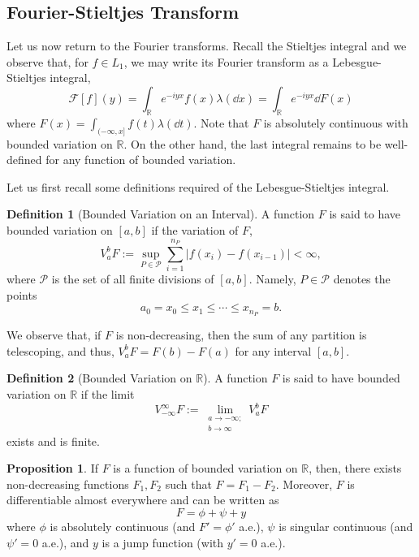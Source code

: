 \documentclass[]{article}
\theoremstyle{definition}
\theoremstyle{definition}
\newtheorem{definition}{Definition}[section]
\newtheorem{proposition}{Proposition}[section]
\begin{document}
\subsection{Fourier-Stieltjes Transform}

Let us now return to the Fourier transforms. Recall the Stieltjes integral 
and we observe that, for \(f \in L_1\), we may write its Fourier transform 
as a Lebesgue-Stieltjes integral,
\[\mathcal{F}[f](y) = \int_{\mathbb{R}}e^{-iyx}f(x)\lambda(\dd x)
  = \int_{\mathbb{R}} e^{-iyx}\dd F(x)\]
where \(F(x) = \int_{(-\infty, x]} f(t) \lambda(\dd t)\). Note that \(F\) is 
absolutely continuous with bounded variation on \(\mathbb{R}\). On the other 
hand, the last integral remains to be well-defined for any function of bounded 
variation.

Let us first recall some definitions required of the Lebesgue-Stieltjes integral. 

\begin{definition}[Bounded Variation on an Interval]
  A function \(F\) is said to have bounded variation on \([a, b]\) if the variation 
  of \(F\),
  \[V_a^bF := \sup_{P \in \mathcal{P}}\sum_{i = 1}^{n_P} |f(x_i) - f(x_{i - 1})| < \infty,\]
  where \(\mathcal{P}\) is the set of all finite divisions of \([a, b]\). Namely, 
  \(P \in \mathcal{P}\) denotes the points 
  \[a_0 = x_0 \le x_1 \le \cdots \le x_{n_P} = b.\]
\end{definition}

We observe that, if \(F\) is non-decreasing, then the sum of any partition is 
telescoping, and thus, \(V_a^b F = F(b) - F(a)\) for any interval \([a, b]\).

\begin{definition}[Bounded Variation on \(\mathbb{R}\)]
  A function \(F\) is said to have bounded variation on \(\mathbb{R}\) if the 
  limit
  \[V_{-\infty}^\infty F := 
  \lim_{\substack{a \to -\infty;\\ b \to \infty}}V_a^b F\]
  exists and is finite.
\end{definition}

\begin{proposition}
  If \(F\) is a function of bounded variation on \(\mathbb{R}\), then, there 
  exists non-decreasing functions \(F_1, F_2\) such that \(F = F_1 - F_2\). 
  Moreover, \(F\) is differentiable almost everywhere 
  and can be written as 
  \[F = \phi + \psi + y\]
  where \(\phi\) is absolutely continuous (and \(F' = \phi'\) a.e.), 
  \(\psi\) is singular continuous (and \(\psi' = 0\) a.e.), and 
  \(y\) is a jump function (with \(y' = 0\) a.e.).
\end{proposition}
\end{document}
